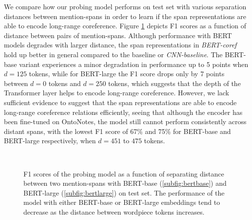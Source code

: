 \documentclass[11pt]{article}
\begin{document}
We compare how our probing model performs on test set with various separation distances between mention-spans in order to learn if the span representations are able to encode long-range coreference. Figure \ref{fig:longrange_result} depicts F1 scores as a function of distance between pairs of mention-spans. Although performance with BERT models degrades with larger distance, the span representations in \textit{BERT-coref} hold up better in general compared to the baseline or \textit{CNN-baseline}. The BERT-base variant experiences a minor degradation in performance up to 5 points when $d=125$ tokens, while for BERT-large the F1 score drops only by 7 points between $d=0$ tokens and $d=250$ tokens, which suggests that the depth of the Transformer layer helps to encode long-range coreference. However, we lack sufficient evidence to suggest that the span representations are able to encode long-range coreference relations efficiently, seeing that although the encoder has been fine-tuned on OntoNotes, the model still cannot perform consistently across distant spans, with the lowest F1 score of 67\% and 75\% for BERT-base and BERT-large respectively, when $d=451$ to $475$ tokens.
\begin{figure}[h!]
 \\
  \caption{F1 scores of the probing model as a function of separating distance between two mention-spans with BERT-base (\ref{subfig:bertbase}) and BERT-large (\ref{subfig:bertlarge}) on test set. The performance of the model with either BERT-base or BERT-large embeddings tend to decrease as the distance between wordpiece tokens increases.}
  \label{fig:longrange_result} 
\end{figure}
\end{document}

